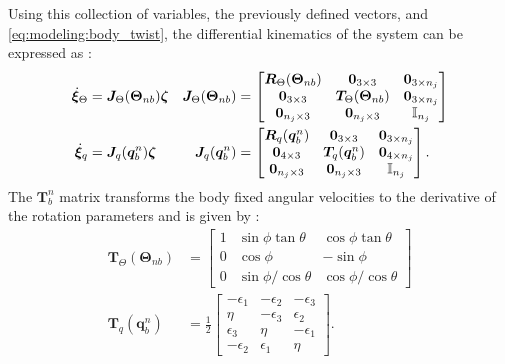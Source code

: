 Using this collection of variables,
the previously defined vectors, and \autoref{eq:modeling:body_twist}, 
the differential kinematics of the system can be expressed as \cite{fossen2021}:
\begin{subequations}
\label{eq:mod:jac}
\begin{align}
    \dot{\bm{\xi}}_{\Theta} &= \bm{J}_{\Theta}(\bm{\Theta}_{nb})\bm{\zeta} &
    \bm{J}_{\Theta}(\bm{\Theta}_{nb}) &= \begin{bmatrix}
        \bm{R}_{\Theta}(\bm{\Theta}_{nb}) & \bm{0}_{3 \times 3} & \bm{0}_{3 \times n_j} \\
        \bm{0}_{3 \times 3} & \bm{T}_{\Theta}(\bm{\Theta}_{nb}) & \bm{0}_{3 \times n_j} \\
        \bm{0}_{n_j \times 3} & \bm{0}_{n_j \times 3} & \mathbb{I}_{n_j}
    \end{bmatrix} \\
    \dot{\bm{\xi}}_{q} &= \bm{J}_{q}(\bm{q}_{b}^n)\bm{\zeta} &
    \bm{J}_{q}(\bm{q}_{b}^n) &= \begin{bmatrix}
        \bm{R}_{q}(\bm{q}_{b}^n) & \bm{0}_{3 \times 3} & \bm{0}_{3 \times n_j} \\
        \bm{0}_{4 \times 3} & \bm{T}_{q}(\bm{q}_{b}^n) & \bm{0}_{4 \times n_j} \\
        \bm{0}_{n_j \times 3} & \bm{0}_{n_j \times 3} & \mathbb{I}_{n_j}
    \end{bmatrix}.
\end{align}
\end{subequations}
The $\bm{T}_b^n$ matrix transforms the body fixed angular velocities to the derivative of the
rotation parameters and is given by \cite{fossen2021}:
\begin{subequations}
    \begin{align}
        \bm{T}_{\Theta}(\bm{\Theta}_{nb}) &= \begin{bmatrix}
            1 & \sin\phi \tan\theta & \cos \phi \tan \theta \\
            0 & \cos \phi & -\sin\phi \\
            0 & \sin \phi / \cos \theta & \cos \phi / \cos \theta
        \end{bmatrix} \\
        \bm{T}_{q}(\bm{q}_{b}^n) &= \frac{1}{2}\begin{bmatrix}
            -\epsilon_1 & -\epsilon_2 & -\epsilon_3 \\
            \eta & -\epsilon_3 & \epsilon_2 \\
            \epsilon_3 & \eta & -\epsilon_1 \\
            -\epsilon_2 & \epsilon_1 & \eta
        \end{bmatrix}.
    \end{align}
\end{subequations}

